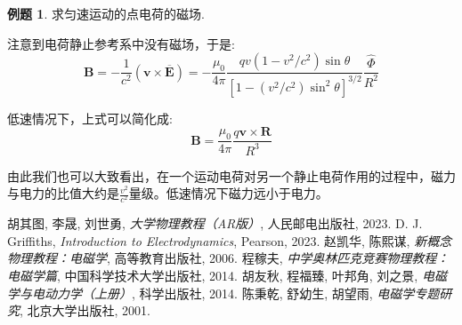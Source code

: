 \documentclass[12pt,a4paper,oneside]{report}
\theoremstyle{definition}
\newtheorem{example}{例题}[chapter]
\theoremstyle{remark}
\newcommand{\mb}[1]{\mathbf{#1}}
\begin{document}
\begin{example}
  求匀速运动的点电荷的磁场.

  注意到电荷静止参考系中没有磁场，于是:
  \[
  \mb{B} = -\frac{1}{c^2}(\mb{v}\times \overline{\mb{E}}) = -\frac{\mu_0}{4\pi}\frac{qv(1-v^2/c^2)\sin\theta}{[1-(v^2/c^2)\sin^2\theta]^{3/2}} \frac{\hat{\Phi}}{R^2}
  \]

  低速情况下，上式可以简化成:
  \[
  \mb{B} = \frac{\mu_0}{4\pi}\frac{q\mb{v}\times\mb{R}}{R^3}
  \]

  由此我们也可以大致看出，在一个运动电荷对另一个静止电荷作用的过程中，磁力与电力的比值大约是$\frac{v^2}{c^2}$量级。低速情况下磁力远小于电力。
\end{example}

\begin{thebibliography}{99}
 胡其图, 李晟, 刘世勇, \textit{大学物理教程（AR版）}, 人民邮电出版社, 2023.
 D. J. Griffiths, \textit{Introduction to Electrodynamics}, Pearson, 2023.
 赵凯华, 陈熙谋, \textit{新概念物理教程：电磁学}, 高等教育出版社, 2006.
 程稼夫, \textit{中学奥林匹克竞赛物理教程：电磁学篇}, 中国科学技术大学出版社, 2014.
 胡友秋, 程福臻, 叶邦角, 刘之景, \textit{电磁学与电动力学（上册）}, 科学出版社, 2014.
 陈秉乾, 舒幼生, 胡望雨, \textit{电磁学专题研究}, 北京大学出版社, 2001.

\end{thebibliography}
\end{document}
